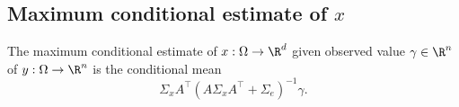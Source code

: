 \subsection*{Maximum conditional estimate of $x$}

\begin{proposition}
The maximum conditional estimate of $x: \Omega  \to \R ^d$ given observed value $\gamma  \in \R ^n$ of $y: \Omega  \to \R ^n$ is the conditional mean
\[
\Sigma _{x} A^\top (A\Sigma _{x}A^\top  + \Sigma _{e})^{-1}\gamma .
\]
\end{proposition}
